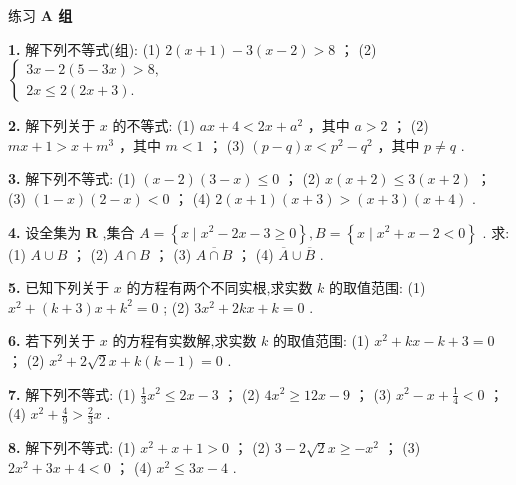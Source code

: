 \documentclass[a4paper,10pt,oneside,fontset=none]{ctexbook}
\renewcommand{\geq}{\geqslant}
\renewcommand{\leq}{\leqslant}
\newenvironment{exercise}[1][]{\begin{exBox}{练习}{#1}}{\end{exBox}}
\numberwithin{equation}{chapter}
\begin{document}
\begin{exercise}
\textbf{A 组}\par\vspace{0.5em}
\textbf{1.} 解下列不等式(组): (1) $2\left( {x + 1}\right)  - 3\left( {x - 2}\right)  > 8$ ； (2) $\left\{  \begin{array}{l} {3x} - 2\left( {5 - {3x}}\right)  > 8, \\  {2x} \leq  2\left( {{2x} + 3}\right) . \end{array}\right.$
\par\vspace{0.8em}
\textbf{2.} 解下列关于 $x$ 的不等式: (1) ${ax} + 4 < {2x} + {a}^{2}$ ，其中 $a > 2$ ； (2) ${mx} + 1 > x + {m}^{3}$ ，其中 $m < 1$ ； (3) $\left( {p - q}\right) x < {p}^{2} - {q}^{2}$ ，其中 $p \neq  q$ .
\par\vspace{0.8em}
\textbf{3.} 解下列不等式: (1) $\left( {x - 2}\right) \left( {3 - x}\right)  \leq  0$ ； (2) $x\left( {x + 2}\right)  \leq  3\left( {x + 2}\right)$ ； (3) $\left( {1 - x}\right) \left( {2 - x}\right)  < 0$ ； (4) $2\left( {x + 1}\right) \left( {x + 3}\right)  > \left( {x + 3}\right) \left( {x + 4}\right)$ .
\par\vspace{0.8em}
\textbf{4.} 设全集为 $\mathbf{R}$ ,集合 $A = \left\{  {x \mid  {x}^{2} - {2x} - 3 \geq  0}\right\}  , B = \left\{  {x \mid  {x}^{2} + x - 2 < 0}\right\}$ . 求: (1) $A \cup  B$ ； (2) $A \cap  B$ ； (3) $\overline{A \cap  B}$ ； (4) $\overline{A} \cup  \overline{B}$ .
\par\vspace{0.8em}
\textbf{5.} 已知下列关于 $x$ 的方程有两个不同实根,求实数 $k$ 的取值范围: (1) ${x}^{2} + \left( {k + 3}\right) x + {k}^{2} = 0$ ; (2) $3{x}^{2} + {2kx} + k = 0$ .
\par\vspace{0.8em}
\textbf{6.} 若下列关于 $x$ 的方程有实数解,求实数 $k$ 的取值范围: (1) ${x}^{2} + {kx} - k + 3 = 0$ ； (2) ${x}^{2} + {2\sqrt{2}}x + k\left( {k - 1}\right)  = 0$ .
\par\vspace{0.8em}
\textbf{7.} 解下列不等式: (1) $\frac{1}{3}{x}^{2} \leq  {2x} - 3$ ； (2) $4{x}^{2} \geq  {12x} - 9$ ； (3) ${x}^{2} - x + \frac{1}{4} < 0$ ； (4) ${x}^{2} + \frac{4}{9} > \frac{2}{3}x$ .
\par\vspace{0.8em}
\textbf{8.} 解下列不等式: (1) ${x}^{2} + x + 1 > 0$ ； (2) $3 - 2\sqrt{2}x \geq   - {x}^{2}$ ； (3) $2{x}^{2} + {3x} + 4 < 0$ ； (4) ${x}^{2} \leq  {3x} - 4$ .

\end{exercise}
\end{document}
